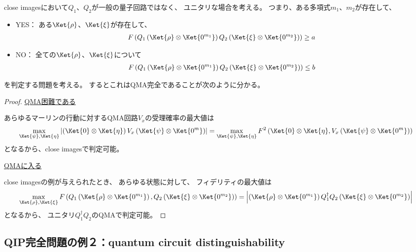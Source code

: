 \documentclass[a4paper, 10pt]{jsarticle}
\begin{document}
close imagesにおいて$Q_1$、$Q_2$が一般の量子回路ではなく、
ユニタリな場合を考える。
つまり、ある多項式$m_1$、$m_2$が存在して、
\begin{itemize}
	\item YES：
	ある$\Ket{\rho}$、$\Ket{\xi}$が存在して、
	\begin{align}
		F\left( Q_1 \left( \Ket{\rho} \otimes \Ket{0^{m_1}} \right)
		Q_2 \left( \Ket{\xi} \otimes \Ket{0^{m_2}} \right) \right)
		\geq a
	\end{align}
	\item NO：
	全ての$\Ket{\rho}$、$\Ket{\xi}$について
	\begin{align}
		F\left( Q_1 \left( \Ket{\rho} \otimes \Ket{0^{m_1}} \right)
		Q_2 \left( \Ket{\xi} \otimes \Ket{0^{m_2}} \right) \right)
		\leq b
	\end{align}
\end{itemize}
を判定する問題を考える。
するとこれはQMA完全であることが次のように分かる。
\begin{proof}
	\underline{QMA困難である}

	あらゆるマーリンの行動に対するQMA回路$V_x$の受理確率の最大値は
	\begin{align}
		\max_{\Ket{\psi}, \Ket{\eta}} \left|
			\left( \Ket{0} \otimes \Ket{\eta} \right)
			V_x \left( \Ket{\psi} \otimes \Ket{0^{m}} \right)
		\right|
		= \max_{\Ket{\psi}, \Ket{\eta}}
		F^2 \left( 
			\Ket{0} \otimes \Ket{\eta},
			V_x \left( \Ket{\psi} \otimes \Ket{0^{m}} \right)
		 \right)
	\end{align}
	となるから、close imagesで判定可能。

	\noindent \underline{QMAに入る}

	close imagesの例が与えられたとき、
	あらゆる状態に対して、
	フィデリティの最大値は
	\begin{align}
		\max_{\Ket{\rho}, \Ket{\xi}} F\left( 
			Q_1 \left( \Ket{\rho} \otimes \Ket{0^{m_1}} \right),
			Q_2 \left( \Ket{\xi} \otimes \Ket{0^{m_2}} \right)
		\right)
		= \left| \left( \Ket{\rho} \otimes \Ket{0^{m_1}} \right)
		Q_1^\dagger Q_2
		\left( \Ket{\xi} \otimes \Ket{0^{m_2}} \right) \right|
	\end{align}
	となるから、
	ユニタリ$Q_1^\dagger Q_2$のQMAで判定可能。
\end{proof}

\subsection{QIP完全問題の例２：quantum circuit distinguishability}
\end{document}
